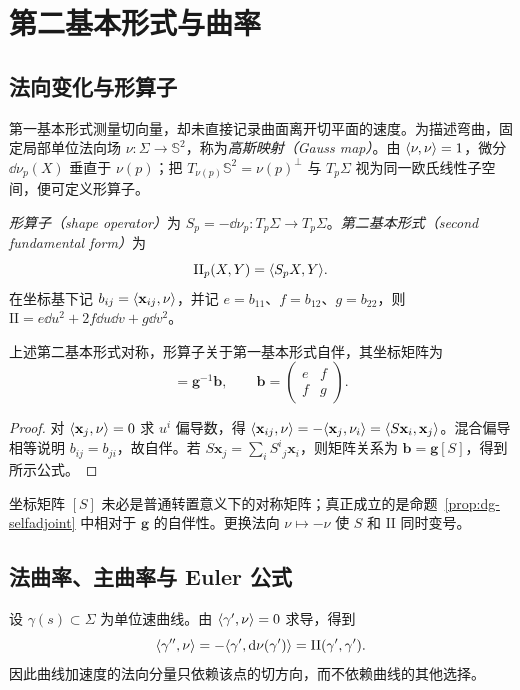 \setcounter{chapter}{5} %
\chapter{第二基本形式与曲率}
\label{chap:dg-curvature}

\section{法向变化与形算子}
第一基本形式测量切向量，却未直接记录曲面离开切平面的速度。为描述弯曲，固定局部单位法向场 $\nu:\Sigma\to\mathbb S^2$，称为\emph{高斯映射（Gauss map）}。由 $\langle \nu,\nu\rangle=1$，微分 $\dd\nu_p(X)$ 垂直于 $\nu(p)$；把 $T_{\nu(p)}\mathbb S^2=\nu(p)^\perp$ 与 $T_p\Sigma$ 视为同一欧氏线性子空间，便可定义形算子。

\begin{definition}[形算子与第二基本形式]
\emph{形算子（shape operator）}为 $S_p=-\dd\nu_p:T_p\Sigma\to T_p\Sigma$。\emph{第二基本形式（second fundamental form）}为
\[
 \mathrm{II}_p(X,Y)=\langle S_pX,Y\rangle.
\]
在坐标基下记 $b_{ij}=\langle \mathbf x_{ij},\nu\rangle$，并记 $e=b_{11}$、$f=b_{12}$、$g=b_{22}$，则 $\mathrm{II}=e\dd u^2+2f\dd u\dd v+g\dd v^2$。
\end{definition}

\begin{proposition}[形算子的自伴性]
上述第二基本形式对称，形算子关于第一基本形式自伴，其坐标矩阵为
\begin{equation}
 [S]=\mathbf g^{-1}\mathbf b,\qquad
 \mathbf b=\begin{pmatrix}e&f\\f&g\end{pmatrix}.
 \label{eq:dg-shape-matrix}
\end{equation}
\end{proposition}
\begin{proof}
对 $\langle \mathbf x_j,\nu\rangle=0$ 求 $u^i$ 偏导数，得 $\langle \mathbf x_{ij},\nu\rangle=-\langle \mathbf x_j,\nu_i\rangle=\langle S\mathbf x_i,\mathbf x_j\rangle$。混合偏导相等说明 $b_{ij}=b_{ji}$，故自伴。若 $S\mathbf x_j=\sum_iS^i{}_j\mathbf x_i$，则矩阵关系为 $\mathbf b=\mathbf g[S]$，得到所示公式。
\end{proof}
坐标矩阵 $[S]$ 未必是普通转置意义下的对称矩阵；真正成立的是命题~\ref{prop:dg-selfadjoint} 中相对于 $\mathbf g$ 的自伴性。更换法向 $\nu\mapsto-\nu$ 使 $S$ 和 $\mathrm{II}$ 同时变号。

\section{法曲率、主曲率与 Euler 公式}
设 $\gamma(s)\subset\Sigma$ 为单位速曲线。由 $\langle \gamma',\nu\rangle=0$ 求导，得到
\[
 \langle \gamma'',\nu\rangle=-\langle \gamma',\mathop{}\!\mathrm d\nu(\gamma')\rangle
 =\mathrm{II}(\gamma',\gamma').
\]
因此曲线加速度的法向分量只依赖该点的切方向，而不依赖曲线的其他选择。

